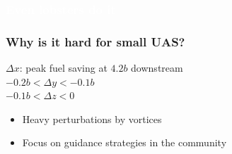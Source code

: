 \documentclass[12pt,svgnames,table,draft=false]{beamer}
\begin{document}
\begin{frame}\frametitle{\textcolor{white}{Even lobsters do it}}
\end{frame}


\begin{frame}\frametitle{\hspace{2em} Why is it hard for small UAS?}
\vspace{-1em}
\centering

\begin{tcolorbox}[width=.8\textwidth,colback={gray!10!}]  
 \centering
 $\Delta x$: peak fuel saving at $4.2 b$ downstream \cite{jake2003f}\\
 $-0.2 b < \Delta y < -0.1 b$ \\
 $-0.1 b < \Delta z < 0$ \\
\end{tcolorbox}  


\begin{tcolorbox}[width=.8\textwidth,colback={gray!10!}]  
\begin{itemize}
\item Heavy perturbations by vortices
\item Focus on guidance strategies in the community
\end{itemize}
\end{tcolorbox}  

\end{frame}
\end{document}
